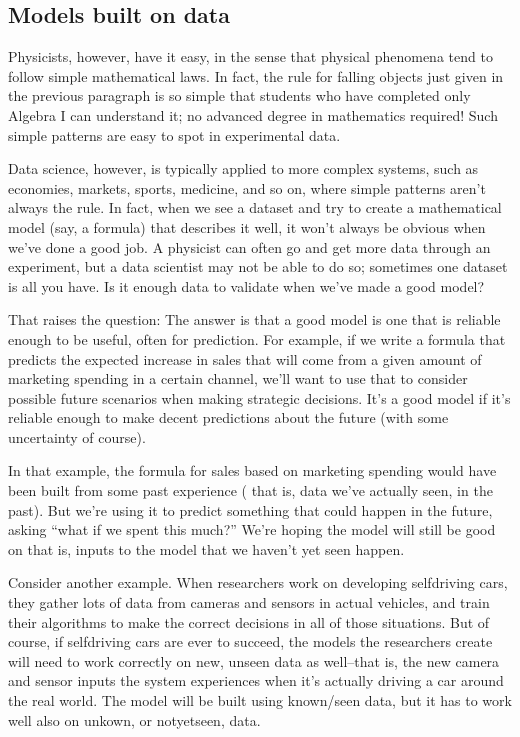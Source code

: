 \documentclass[letterpaper,10pt,english]{sphinxmanual}
\begin{document}
\subsection{Models built on data}
\label{\detokenize{chapter-17-machine-learning:models-built-on-data}}
Physicists, however, have it easy, in the sense that physical phenomena tend to follow simple mathematical laws.  In fact, the rule for falling objects just given in the previous paragraph is so simple that students who have completed only Algebra I can understand it; no advanced degree in mathematics required!  Such simple patterns are easy to spot in experimental data.

Data science, however, is typically applied to more complex systems, such as economies, markets, sports, medicine, and so on, where simple patterns aren’t always the rule.  In fact, when we see a dataset and try to create a mathematical model (say, a formula) that describes it well, it won’t always be obvious when we’ve done a good job.  A physicist can often go and get more data through an experiment, but a data scientist may not be able to do so; sometimes one dataset is all you have.  Is it enough data to validate when we’ve made a good model?

That raises the question:    The answer is that a good model is one that is reliable enough to be useful, often for prediction.  For example, if we write a formula that predicts the expected increase in sales that will come from a given amount of marketing spending in a certain channel, we’ll want to use that to consider possible future scenarios when making strategic decisions.  It’s a good model if it’s reliable enough to make decent predictions about the future (with some uncertainty of course).

In that example, the formula for sales based on marketing spending would have been built from some past experience ( that is, data we’ve actually seen, in the past).  But we’re using it to predict something that could happen in the future, asking “what if we spent this much?”  We’re hoping the model will still be good on  that is, inputs to the model that we haven’t yet seen happen.

Consider another example.  When researchers work on developing self\sphinxhyphen{}driving cars, they gather lots of data from cameras and sensors in actual vehicles, and train their algorithms to make the correct decisions in all of those situations.  But of course, if self\sphinxhyphen{}driving cars are ever to succeed, the models the researchers create will need to work correctly on new, unseen data as well–that is, the new camera and sensor inputs the system experiences when it’s actually driving a car around the real world.  The model will be built using known/seen data, but it has to work well also on unkown, or not\sphinxhyphen{}yet\sphinxhyphen{}seen, data.
\end{document}
